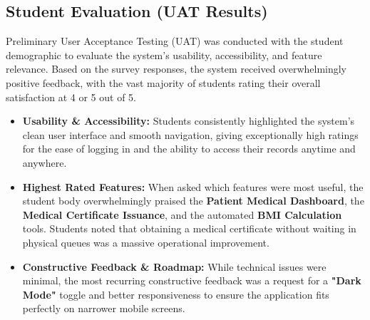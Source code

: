 \subsection{Student Evaluation (UAT Results)}
Preliminary User Acceptance Testing (UAT) was conducted with the student demographic to evaluate the system's usability, accessibility, and feature relevance. Based on the survey responses, the system received overwhelmingly positive feedback, with the vast majority of students rating their overall satisfaction at 4 or 5 out of 5.

\begin{itemize}
    \item \textbf{Usability \& Accessibility:} Students consistently highlighted the system's clean user interface and smooth navigation, giving exceptionally high ratings for the ease of logging in and the ability to access their records anytime and anywhere.
    \item \textbf{Highest Rated Features:} When asked which features were most useful, the student body overwhelmingly praised the \textbf{Patient Medical Dashboard}, the \textbf{Medical Certificate Issuance}, and the automated \textbf{BMI Calculation} tools. Students noted that obtaining a medical certificate without waiting in physical queues was a massive operational improvement.
    \item \textbf{Constructive Feedback \& Roadmap:} While technical issues were minimal, the most recurring constructive feedback was a request for a \textbf{"Dark Mode"} toggle and better responsiveness to ensure the application fits perfectly on narrower mobile screens.
\end{itemize}
